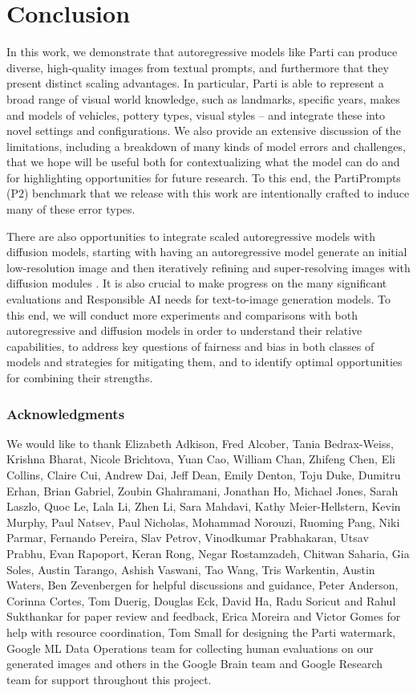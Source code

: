 \section{Conclusion}

In this work, we demonstrate that autoregressive models like Parti can produce diverse, high-quality images from textual prompts, and furthermore that they present distinct scaling advantages. In particular, Parti is able to represent a broad range of visual world knowledge, such as landmarks, specific years, makes and models of vehicles, pottery types, visual styles -- and integrate these into novel settings and configurations. We also provide an extensive discussion of the limitations, including a breakdown of many kinds of model errors and challenges, that we hope will be useful both for contextualizing what the model can do and for highlighting opportunities for future research. To this end, the PartiPrompts (P$2$) benchmark that we release with this work are intentionally crafted to induce many of these error types.

There are also opportunities to integrate scaled autoregressive models with diffusion models, starting with having an autoregressive model generate an initial low-resolution image and then iteratively refining and super-resolving images with diffusion modules \cite{vqdiffusion, ramesh2022hierarchical, imagen}. It is also crucial to make progress on the many significant evaluations and Responsible AI needs for text-to-image generation models. To this end, we will conduct more experiments and comparisons with both autoregressive and diffusion models in order to understand their relative capabilities, to address key questions of fairness and bias in both classes of models and strategies for mitigating them, and to identify optimal opportunities for combining their strengths.

\subsubsection*{Acknowledgments}
We would like to thank Elizabeth Adkison, Fred Alcober, Tania Bedrax-Weiss, Krishna Bharat, Nicole Brichtova, Yuan Cao, William Chan, Zhifeng Chen, Eli Collins, Claire Cui, Andrew Dai, Jeff Dean, Emily Denton, Toju Duke, Dumitru Erhan, Brian Gabriel, Zoubin Ghahramani, Jonathan Ho, Michael Jones, Sarah Laszlo, Quoc Le, Lala Li, Zhen Li, Sara Mahdavi, Kathy Meier-Hellstern, Kevin Murphy, Paul Natsev, Paul Nicholas, Mohammad Norouzi, Ruoming Pang, Niki Parmar, Fernando Pereira, Slav Petrov, Vinodkumar Prabhakaran, Utsav Prabhu, Evan Rapoport, Keran Rong, Negar Rostamzadeh, Chitwan Saharia, Gia Soles, Austin Tarango, Ashish Vaswani, Tao Wang, Tris Warkentin, Austin Waters, Ben Zevenbergen for helpful discussions and guidance, Peter Anderson, Corinna Cortes, Tom Duerig, Douglas Eck, David Ha, Radu Soricut and Rahul Sukthankar for paper review and feedback, Erica Moreira and Victor Gomes for help with resource coordination, Tom Small for designing the Parti watermark, Google ML Data Operations team for collecting human evaluations on our generated images and others in the Google Brain team and Google Research team for support throughout this project.

